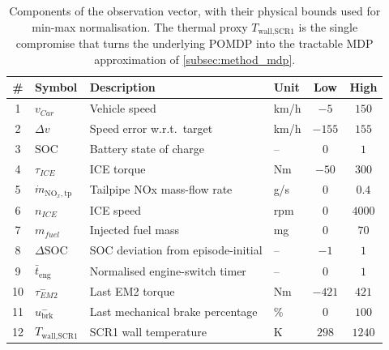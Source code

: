 \begin{table}[H]
  \centering
  \small
  \begin{tabular}{|c|l|l|l|c|c|}
    \hline
    \textbf{\#} & \textbf{Symbol} & \textbf{Description} & \textbf{Unit} & \textbf{Low} & \textbf{High} \\
    \hline
    1  & $v_{Car}$              & Vehicle speed                          & km/h     & $-5$    & $150$   \\
    2  & $\Delta v$              & Speed error w.r.t.\ target             & km/h     & $-155$  & $155$   \\
    3  & $\mathrm{SOC}$         & Battery state of charge                & --       & $0$     & $1$     \\
    4  & $\tau_{ICE}$            & ICE torque                             & Nm       & $-50$   & $300$   \\
    5  & $\dot m_{\mathrm{NO}_{x},\mathrm{tp}}$ & Tailpipe NOx mass-flow rate            & g/s      & $0$     & $0.4$   \\
    6  & $n_{ICE}$               & ICE speed                              & rpm      & $0$     & $4000$  \\
    7  & $m_{fuel}$              & Injected fuel mass                     & mg       & $0$     & $70$    \\
    8  & $\Delta\mathrm{SOC}$   & SOC deviation from episode-initial     & --       & $-1$    & $1$     \\
    9  & $\bar t_{\text{eng}}$  & Normalised engine-switch timer         & --       & $0$     & $1$     \\
    10 & $\tau_{EM2}^{-}$        & Last EM2 torque                        & Nm       & $-421$  & $421$   \\
    11 & $u_{\text{brk}}^{-}$    & Last mechanical brake percentage       & \%       & $0$     & $100$   \\
    12 & $T_{\text{wall,SCR1}}$ & SCR1 wall temperature                  & K        & $298$   & $1240$  \\
    \hline
  \end{tabular}
  \caption[Observation-vector components and bounds]{Components of the observation vector, with their physical bounds used for min-max normalisation. The thermal proxy $T_{\text{wall,SCR1}}$ is the single compromise that turns the underlying POMDP into the tractable MDP approximation of \autoref{subsec:method_mdp}.}
  \label{tab:obs_vector}
\end{table}

